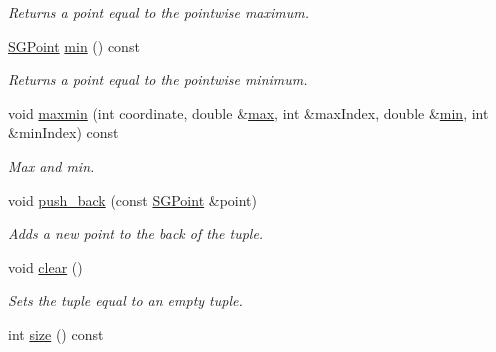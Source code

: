 \begin{DoxyCompactItemize}
\begin{DoxyCompactList}\small\item\em Returns a point equal to the pointwise maximum. \end{DoxyCompactList}\item 
\hypertarget{class_s_g_tuple_a1ac88e2f97cefe88d1a155beab63297a}{\hyperlink{class_s_g_point}{S\+G\+Point} \hyperlink{class_s_g_tuple_a1ac88e2f97cefe88d1a155beab63297a}{min} () const }\label{class_s_g_tuple_a1ac88e2f97cefe88d1a155beab63297a}

\begin{DoxyCompactList}\small\item\em Returns a point equal to the pointwise minimum. \end{DoxyCompactList}\item 
void \hyperlink{class_s_g_tuple_a57c30a62e3faaaa2b8834cb1cd1b617c}{maxmin} (int coordinate, double \&\hyperlink{class_s_g_tuple_a616801eebc023c41e305c1cde9dcfccd}{max}, int \&max\+Index, double \&\hyperlink{class_s_g_tuple_ab413ab0a7d009f719b594aef2862f2af}{min}, int \&min\+Index) const 
\begin{DoxyCompactList}\small\item\em Max and min. \end{DoxyCompactList}\item 
\hypertarget{class_s_g_tuple_a5aae68fc99fd77e346ee712b634fc358}{void \hyperlink{class_s_g_tuple_a5aae68fc99fd77e346ee712b634fc358}{push\+\_\+back} (const \hyperlink{class_s_g_point}{S\+G\+Point} \&point)}\label{class_s_g_tuple_a5aae68fc99fd77e346ee712b634fc358}

\begin{DoxyCompactList}\small\item\em Adds a new point to the back of the tuple. \end{DoxyCompactList}\item 
\hypertarget{class_s_g_tuple_a5eec252277fa0f1007ce54dec61a6cdb}{void \hyperlink{class_s_g_tuple_a5eec252277fa0f1007ce54dec61a6cdb}{clear} ()}\label{class_s_g_tuple_a5eec252277fa0f1007ce54dec61a6cdb}

\begin{DoxyCompactList}\small\item\em Sets the tuple equal to an empty tuple. \end{DoxyCompactList}\item 
\hypertarget{class_s_g_tuple_a84361904d7b69dd1a4097dc7eaa7b133}{int \hyperlink{class_s_g_tuple_a84361904d7b69dd1a4097dc7eaa7b133}{size} () const }\label{class_s_g_tuple_a84361904d7b69dd1a4097dc7eaa7b133}


\end{DoxyCompactItemize}
